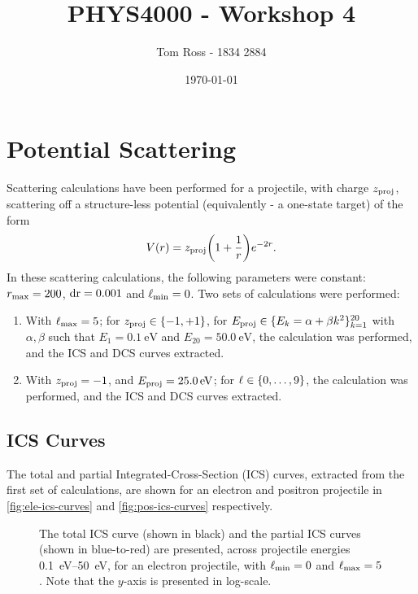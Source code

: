 \documentclass{article}
\title{PHYS4000 - Workshop 4}
\author{Tom Ross - 1834 2884}
\date{\today}
\begin{document}
\tableofcontents

\listoffigures

\listoftables

\clearpage

\section{Potential Scattering}
\label{sec:potential-scattering}

Scattering calculations have been performed for a projectile, with charge
$z_{\rm{proj}}$, scattering off a structure-less potential (equivalently - a
one-state target) of the form
\begin{equation}
  \label{eq:potential}
  V\lr{r}
  =
  z_{\rm{proj}}
  \lr[\bigg]
  {
    1
    +
    \dfrac{1}{r}
  }
  \exp{- 2 r}
  .
\end{equation}
In these scattering calculations, the following parameters were constant:
$r_{\rm{max}} = 200$, $\rm{dr} = 0.001$ and $\ell_{\rm{min}} = 0$.
Two sets of calculations were performed:
\begin{enumerate}
\item
  With $\ell_{\rm{\max}} = 5$; for $z_{\rm{proj}} \in \lbrace-1, +1\rbrace$,
  for $E_{\rm{proj}} \in \lbrace E_{k} = \alpha + \beta k^{2}\rbrace_{k = 1}^{20}$
  with $\alpha, \beta$ such that $E_{1} = \SI{0.1}{\eV}$ and
  $E_{20} = \SI{50.0}{\eV}$, the calculation was performed, and the ICS and DCS
  curves extracted.

\item
  With $z_{\rm{proj}} = -1$, and $E_{\rm{proj}} = \SI{25.0}{\eV}$; for
  $\ell \in \lbrace0, \dotsc, 9\rbrace$, the calculation was performed, and the ICS
  and DCS curves extracted.
\end{enumerate}

\subsection{ICS Curves}
\label{sec:ics-curves}

The total and partial Integrated-Cross-Section (ICS) curves, extracted from the
first set of calculations, are shown for an electron and positron projectile in
\autoref{fig:ele-ics-curves} and \autoref{fig:pos-ics-curves} respectively.

\begin{figure}[h]
  \begin{center}
    
  \end{center}
  \caption[Electron ICS Curves]{
    The total ICS curve (shown in black) and the partial ICS curves (shown in
    blue-to-red) are presented, across projectile energies
    \SIrange{0.1}{50}{eV}, for an electron projectile, with
    $\ell_{\rm{min}} = 0$ and $\ell_{\rm{max}} = 5$.
    Note that the $y$-axis is presented in log-scale.
  }
  \label{fig:ele-ics-curves}
\end{figure}
\end{document}
